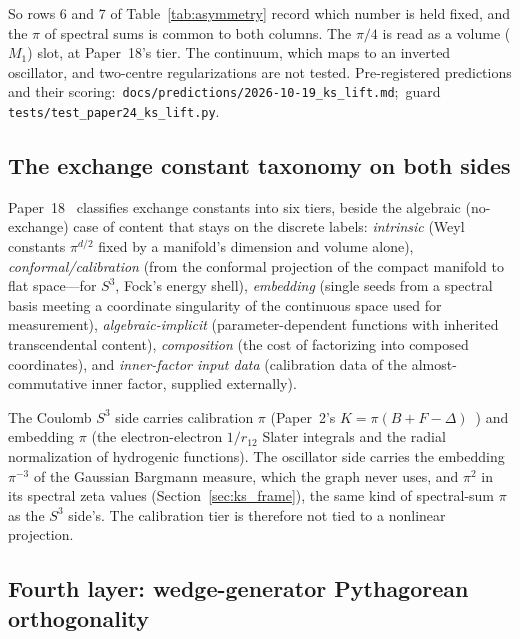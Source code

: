 \documentclass[twocolumn,pra,amsmath,amssymb,superscriptaddress]{revtex4-2}
\begin{document}
So rows 6 and 7 of Table~\ref{tab:asymmetry} record which number is
held fixed, and the $\pi$ of spectral sums is common to both columns.
The $\pi/4$ is read as a volume ($M_1$) slot, at Paper~18's tier.  The
continuum, which maps to an inverted oscillator, and two-centre
regularizations are not tested.  Pre-registered predictions and their
scoring:\ \texttt{docs/predictions/2026-10-19\_ks\_lift.md};\ guard
\texttt{tests/test\_paper24\_ks\_lift.py}.

\subsection{The exchange constant taxonomy on both sides}
\label{sec:taxonomy}

Paper~18~\cite{paper18} classifies exchange constants into six
tiers, beside the algebraic (no-exchange) case of content that stays
on the discrete labels: \emph{intrinsic} (Weyl constants $\pi^{d/2}$
fixed by a manifold's dimension and volume alone),
\emph{conformal/calibration} (from the conformal projection of the
compact manifold to flat space---for $S^3$, Fock's energy shell),
\emph{embedding} (single seeds from a spectral basis meeting a
coordinate singularity of the continuous space used for measurement),
\emph{algebraic-implicit}
(parameter-dependent functions with inherited transcendental
content), \emph{composition} (the cost of factorizing into composed
coordinates), and \emph{inner-factor input data} (calibration data
of the almost-commutative inner factor, supplied externally).

The Coulomb $S^3$ side carries calibration $\pi$ (Paper~2's $K = \pi(B + F -
\Delta)$~\cite{paper2_alpha}) and embedding $\pi$ (the
electron-electron $1/r_{12}$ Slater integrals and the radial
normalization of hydrogenic functions).  The oscillator side carries
the embedding $\pi^{-3}$ of the Gaussian Bargmann measure, which the
graph never uses, and $\pi^2$ in its spectral zeta values
(Section~\ref{sec:ks_frame}), the same kind of spectral-sum $\pi$ as
the $S^3$ side's.  The calibration tier is therefore not tied to a
nonlinear projection.

\subsection{Fourth layer: wedge-generator Pythagorean
orthogonality}
\label{sec:asymmetry_layer4}
\end{document}
